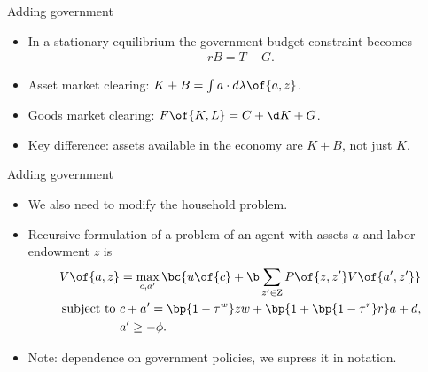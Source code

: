\documentclass[11pt,xcolor={dvipsnames},aspectratio=159,hyperref={pdftex,pdfpagemode=UseNone,hidelinks,pdfdisplaydoctitle=true},usepdftitle=false]{beamer}
\begin{document}
    \begin{frame}{Adding government}
        \begin{itemize}
            \item In a stationary equilibrium the government budget constraint becomes \begin{align*}
                r B = T - G.
            \end{align*}
            \item Asset market clearing: $K + B = \int a \cdot d\lambda\of{a,z}$.
            \item Goods market clearing: $F\of{K,L} = C + \d K + G$.
            \item Key difference: assets available in the economy are $K+B$, not just $K$.
            \end{itemize}
        \end{frame}  

    \begin{frame}{Adding government}
        \begin{itemize}
            \item We also need to modify the household problem. 
            \item Recursive formulation of a problem of an agent with assets $a$ and labor endowment $z$ is 
            \begin{align*}
                V\of{a,z} &= \max_{c, a^\prime} \bc{u\of{c} + \b \sum_{z^\prime \in \text{Z}} P\of{z,z^\prime} V\of{a^\prime,z^\prime} } \\
                \text{subject to  } & c + a^\prime = \bp{1-\tau^w} z w + \bp{1+\bp{1-\tau^r}r} a + d, \\
                & a^\prime \geq -\phi.
            \end{align*}
            \item Note: dependence on government policies, we supress it in notation.
            \end{itemize}
        \end{frame}     
\end{document}
